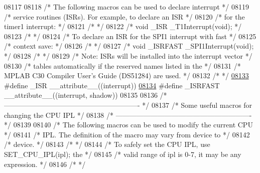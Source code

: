 \begin{DoxyCode}
08117 
08118 \textcolor{comment}{/* The following macros can be used to declare interrupt      */}
08119 \textcolor{comment}{/* service routines (ISRs). For example, to declare an ISR    */}
08120 \textcolor{comment}{/* for the timer1 interrupt:                                  */}
08121 \textcolor{comment}{/*                                                            */}
08122 \textcolor{comment}{/* void \_ISR \_T1Interrupt(void);                              */}
08123 \textcolor{comment}{/*                                                            */}
08124 \textcolor{comment}{/* To declare an ISR for the SPI1 interrupt with fast         */}
08125 \textcolor{comment}{/* context save:                                              */}
08126 \textcolor{comment}{/*                                                            */}
08127 \textcolor{comment}{/* void \_ISRFAST \_SPI1Interrupt(void);                        */}
08128 \textcolor{comment}{/*                                                            */}
08129 \textcolor{comment}{/* Note: ISRs will be installed into the interrupt vector     */}
08130 \textcolor{comment}{/* tables automatically if the reserved names listed in the   */}
08131 \textcolor{comment}{/* MPLAB C30 Compiler User's Guide (DS51284) are used.        */}
08132 \textcolor{comment}{/*                                                            */}
\hypertarget{a00015_source_l08133}{}\hyperlink{a00015_aea8b43f2d1d9e84f03e92d9e68c9aa92}{08133} \textcolor{preprocessor}{#define \_ISR \_\_attribute\_\_((interrupt))}
\hypertarget{a00015_source_l08134}{}\hyperlink{a00015_a65a1e33fffb4853c591da45edd3789a6}{08134} \textcolor{preprocessor}{#define \_ISRFAST \_\_attribute\_\_((interrupt, shadow))}
08135 
08136 \textcolor{comment}{/* ---------------------------------------------------------- */}
08137 \textcolor{comment}{/* Some useful macros for changing the CPU IPL                */}
08138 \textcolor{comment}{/* ---------------------------------------------------------- */}
08139 
08140 \textcolor{comment}{/* The following macros can be used to modify the current CPU */}
08141 \textcolor{comment}{/* IPL. The definition of the macro may vary from device to   */}
08142 \textcolor{comment}{/* device.                                                    */}
08143 \textcolor{comment}{/*                                                            */}
08144 \textcolor{comment}{/* To safely set the CPU IPL, use SET\_CPU\_IPL(ipl); the       */}
08145 \textcolor{comment}{/* valid range of ipl is 0-7, it may be any expression.       */}
08146 \textcolor{comment}{/*                                                            */}

\end{DoxyCode}
